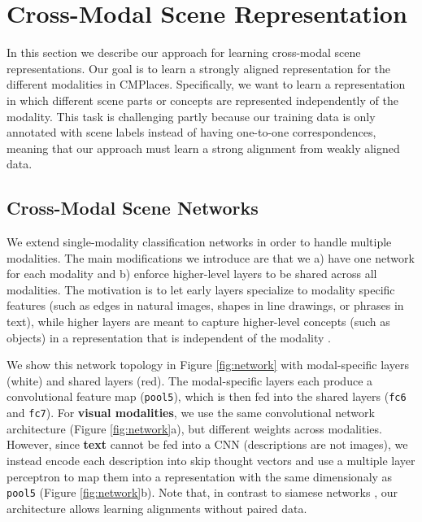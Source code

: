 \documentclass[10pt,journal,compsoc]{IEEEtran}
\begin{document}
\section{Cross-Modal Scene Representation}

    In this section we describe our approach for learning cross-modal scene representations. Our goal is to learn a strongly aligned representation for the different modalities in CMPlaces. Specifically, we want to learn a representation in which different scene parts or concepts are represented independently of the modality. This task is challenging partly because our training data is only annotated with scene labels instead of having one-to-one correspondences, meaning that our approach must learn a strong alignment from weakly aligned data.
    
    
    \subsection{Cross-Modal Scene Networks}
    We extend single-modality classification networks \cite{krizhevsky2012imagenet} in order to handle multiple modalities. The main modifications we introduce are that we a) have one network for each modality and b) enforce higher-level layers to be shared across all modalities. The motivation is to let early layers specialize to modality specific features (such as edges in natural images, shapes in line drawings, or phrases in text), while higher layers are meant to capture higher-level concepts (such as objects) in a representation that is independent of the modality .
    
    We show this network topology in Figure \ref{fig:network} with modal-specific layers (white) and shared layers (red). The modal-specific layers each produce a convolutional feature map (\texttt{pool5}), which is then fed into the shared layers (\texttt{fc6} and \texttt{fc7}). For \textbf{visual modalities}, we use the same convolutional network architecture (Figure \ref{fig:network}a), but different weights across modalities. However, since \textbf{text} cannot be fed into a CNN (descriptions are not images), we instead encode each description into skip thought vectors \cite{kiros2015skip} and use a multiple layer perceptron to map them into a representation with the same dimensionaly as \texttt{pool5} (Figure \ref{fig:network}b). Note that, in contrast to siamese networks \cite{bromley1993signature}, our architecture allows learning alignments without paired data. 
    
\end{document}
